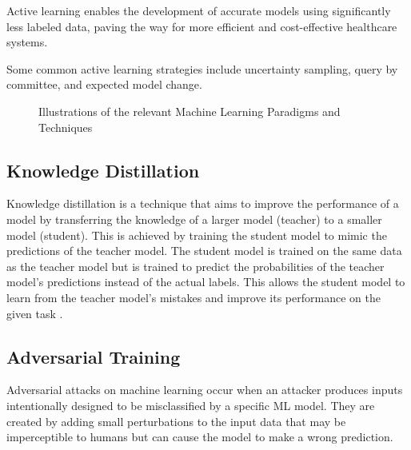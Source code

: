 \documentclass[../main.tex]{subfiles}
\begin{document}
     Active learning enables the development of accurate models using significantly less labeled data, paving the way for more efficient and cost-effective healthcare systems. 
     
     Some common active learning strategies include uncertainty sampling, query by committee, and expected model change. 

     \newpage

    \begin{figure}
        \centering
        \caption{Illustrations of the relevant Machine Learning Paradigms and Techniques}
        \resizebox*{1.15\columnwidth}{!}{
            \hspace*{-1.5cm}
            
        }
        \label{fig:relevant_ml_paradigms}
    \end{figure}
    \clearpage

     \subsection{Knowledge Distillation} \label{sec:knowledge_distillation} 

    Knowledge distillation is a technique that aims to improve the performance of a model by transferring the knowledge of a larger model (teacher) to a smaller model (student). This is achieved by training the student model to mimic the predictions of the teacher model. The student model is trained on the same data as the teacher model but is trained to predict the probabilities of the teacher model's predictions instead of the actual labels. This allows the student model to learn from the teacher model's mistakes and improve its performance on the given task \cite{hinton_distilling_2015}.
    


    \subsection{Adversarial Training} \label{sec:adversarial_training} 

    Adversarial attacks on machine learning occur when an attacker produces inputs intentionally designed to be misclassified by a specific ML model. They are created by adding small perturbations to the input data that may be imperceptible to humans but can cause the model to make a wrong prediction.
    
\end{document}
